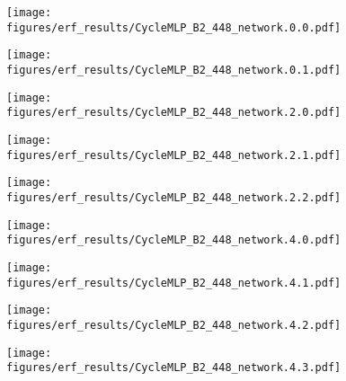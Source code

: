 \documentclass{article}
\begin{document}
\begin{figure}[tb]
  \raggedright
  \begin{minipage}[t]{0.13\hsize}
    \centering
    \texttt{[image: figures/erf\_results/CycleMLP\_B2\_448\_network.0.0.pdf]}
    \label{figure:erf_cyclemlp_448:0}
  \end{minipage}
  \begin{minipage}[t]{0.13\hsize}
    \centering
    \texttt{[image: figures/erf\_results/CycleMLP\_B2\_448\_network.0.1.pdf]}
    \label{figure:erf_cyclemlp_448:1}
  \end{minipage}
  \begin{minipage}[t]{0.13\hsize}
    \centering
    \texttt{[image: figures/erf\_results/CycleMLP\_B2\_448\_network.2.0.pdf]}
    \label{figure:erf_cyclemlp_448:2}
  \end{minipage}
  \begin{minipage}[t]{0.13\hsize}
    \centering
    \texttt{[image: figures/erf\_results/CycleMLP\_B2\_448\_network.2.1.pdf]}
    \label{figure:erf_cyclemlp_448:3}
  \end{minipage}
  \begin{minipage}[t]{0.13\hsize}
    \centering
    \texttt{[image: figures/erf\_results/CycleMLP\_B2\_448\_network.2.2.pdf]}
    \label{figure:erf_cyclemlp_448:4}
  \end{minipage}
  \begin{minipage}[t]{0.13\hsize}
    \centering
    \texttt{[image: figures/erf\_results/CycleMLP\_B2\_448\_network.4.0.pdf]}
    \label{figure:erf_cyclemlp_448:5}
  \end{minipage}
  \begin{minipage}[t]{0.13\hsize}
    \centering
    \texttt{[image: figures/erf\_results/CycleMLP\_B2\_448\_network.4.1.pdf]}
    \label{figure:erf_cyclemlp_448:6}
  \end{minipage}
  \begin{minipage}[t]{0.13\hsize}
    \centering
    \texttt{[image: figures/erf\_results/CycleMLP\_B2\_448\_network.4.2.pdf]}
    \label{figure:erf_cyclemlp_448:7}
  \end{minipage}
  \begin{minipage}[t]{0.13\hsize}
    \centering
    \texttt{[image: figures/erf\_results/CycleMLP\_B2\_448\_network.4.3.pdf]}

\end{minipage}
\end{figure}
\end{document}
